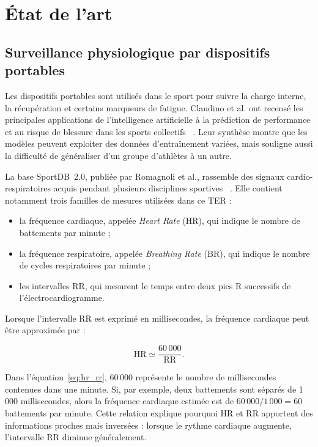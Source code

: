 \documentclass[12pt,a4paper]{article}
\newcommand{\HR}{\mathrm{HR}}
\newcommand{\RR}{\mathrm{RR}}
\begin{document}

\section{État de l'art}
\label{sec:etat_art}

\subsection{Surveillance physiologique par dispositifs portables}

Les dispositifs portables sont utilisés dans le sport pour suivre la charge
interne, la récupération et certains marqueurs de fatigue. Claudino et al.
ont recensé les principales applications de l'intelligence artificielle à la
prédiction de performance et au risque de blessure dans les sports collectifs
~\cite{claudino2019}. Leur synthèse montre que les modèles peuvent exploiter
des données d'entraînement variées, mais souligne aussi la difficulté de
généraliser d'un groupe d'athlètes à un autre.

La base SportDB~2.0, publiée par Romagnoli et al., rassemble des signaux
cardio-respiratoires acquis pendant plusieurs disciplines sportives
~\cite{sportdb2data,sportdb2paper}. Elle contient notamment trois familles de
mesures utilisées dans ce TER :

\begin{itemize}[leftmargin=1.5em]
  \item la fréquence cardiaque, appelée \emph{Heart Rate} (HR), qui indique le
  nombre de battements par minute ;
  \item la fréquence respiratoire, appelée \emph{Breathing Rate} (BR), qui
  indique le nombre de cycles respiratoires par minute ;
  \item les intervalles RR, qui mesurent le temps entre deux pics R
  successifs de l'électrocardiogramme.
\end{itemize}

Lorsque l'intervalle RR est exprimé en millisecondes, la fréquence cardiaque
peut être approximée par :

\begin{equation}
\HR \simeq \frac{60\,000}{\RR}.
\label{eq:hr_rr}
\end{equation}

Dans l'équation~\ref{eq:hr_rr}, $60\,000$ représente le nombre de
millisecondes contenues dans une minute. Si, par exemple, deux battements sont
séparés de 1\,000 millisecondes, alors la fréquence cardiaque estimée est de
$60\,000/1\,000=60$ battements par minute. Cette relation explique pourquoi
HR et RR apportent des informations proches mais inversées : lorsque le
rythme cardiaque augmente, l'intervalle RR diminue généralement.
\end{document}
